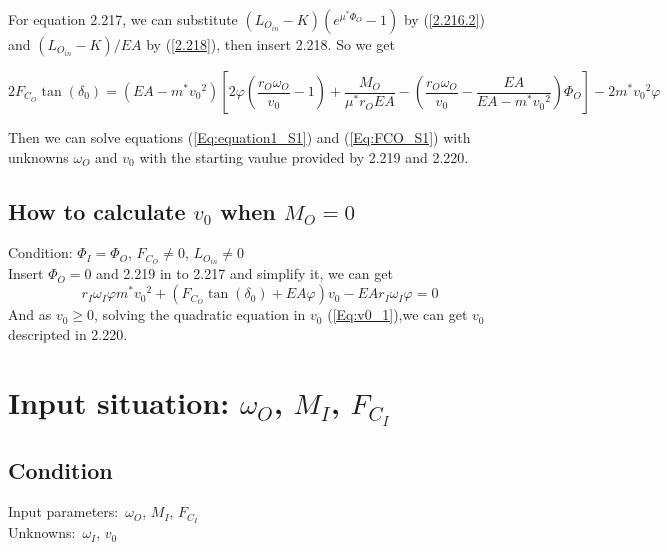 \documentclass[a4paper,fleqn,13pt]{article}
\begin{document}
For equation 2.217, we can substitute $\left(L_{O_{in}} - K \right) \left(e^{\mu^* \Phi_O}-1 \right) $ by (\ref{2.216.2}) 
and $ \left(L_{O_{in}} - K \right) / EA $ by (\ref{2.218}), then insert 2.218. So we get

\begin{equation}  \label{Eq:FCO_S1}
  2F_{C_O} \tan (\delta_0)  = \left(EA-m^*{v_0}^2 \right)\left[2\varphi \left(\frac{r_O\omega_O}{v_0}-1 \right) + \frac{M_O}{\mu^*r_OEA} - \left(\frac{r_O\omega_O}{v_0} - \frac{EA}{EA-m^*{v_0}^2}\right)\Phi_O\right]  - 2m^*{v_0}^2\varphi
\end{equation}

Then we can solve equations (\ref{Eq:equation1_S1}) and (\ref{Eq:FCO_S1}) with unknowns $\omega_O$ and $v_0$ with the starting vaulue provided by 2.219 and 2.220.

\subsection{How to calculate $v_0$ when $M_O = 0$}
Condition: $\Phi_I=\Phi_O$, $F_{C_O} \not = 0$, $L_{O_{in}} \neq 0$  \\
Insert $\Phi_O = 0$ and 2.219 in to 2.217 and simplify it, we can get
\begin{equation} \label{Eq:v0_1}
 r_I\omega_I\varphi m^*{v_0}^2+(F_{C_O}\tan(\delta_0)+EA \varphi )v_0 -EA r_I\omega_I\varphi  = 0
\end{equation}
And as $v_0 \geq 0$, solving the quadratic equation in $v_0$ (\ref{Eq:v0_1}),we can get $v_0$ descripted in 2.220.

\newpage





\section{Input situation: $\omega_O$, $M_I$, $F_{C_I}$}

\subsection{Condition}
Input parameters:\ $\omega_O$, $M_I$, $F_{C_I}$ \\
Unknowns:\ $\omega_I$, $v_0$
\end{document}
